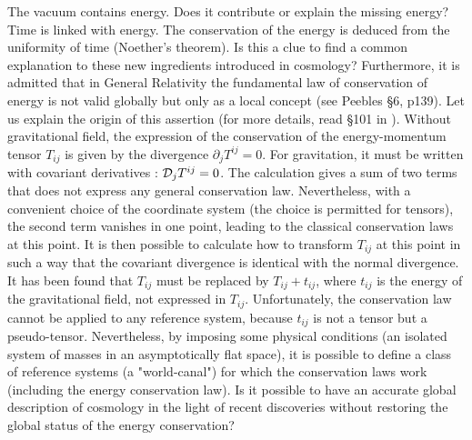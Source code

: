 The vacuum contains energy. Does it contribute or explain the missing energy? Time is linked with energy. The conservation of the energy is deduced from the uniformity of time (Noether's theorem). Is this a clue to find a common explanation to these new ingredients introduced in cosmology?
Furthermore, it is admitted that in General Relativity the  fundamental law of conservation of energy is not valid globally but only as a local concept (see Peebles\cite{peebles} \S6, p139). Let us explain the origin of this assertion (for more details, read \S101 in \cite{ll}). 
Without gravitational field, the expression of  the conservation of the energy-momentum tensor $T_{ij}$  is given by the divergence ${\partial}_j  T^{i  j}=0 $. For gravitation,  it must be written with covariant derivatives  : ${\cal{D}}_j  T^{i  j}=0 $. The calculation gives a sum of two terms that does not express any general conservation law. Nevertheless, with a convenient choice of the coordinate system (the choice is permitted for tensors), the second term vanishes in one point, leading to the classical conservation laws at this point. 
It is then possible to calculate how to transform $T_{ij}$ at this point in such a way that the covariant divergence is identical with the normal divergence. It has been found that $T_{ij}$ must be replaced by $T_{ij}+ t_{ij}$, where $t_{ij}$ is the energy of the gravitational field, not expressed in $T_{ij}$. Unfortunately, the conservation law cannot be applied to any reference system, because  $t_{ij}$  is  not a tensor but a pseudo-tensor. Nevertheless, by imposing some physical conditions (an isolated system of masses in an asymptotically flat space), it is possible to define a class of reference systems (a "world-canal") for which the conservation laws work (including the energy conservation law). 
Is it possible to have an accurate global description of cosmology in the light of recent discoveries without restoring the global status of the energy conservation?

